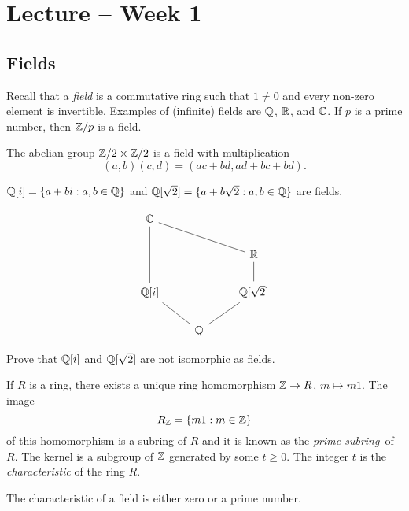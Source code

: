 \section{Lecture -- Week 1}

\subsection{Fields}

Recall that a \emph{field} is a commutative
ring such that $1\ne 0$ and 
every non-zero element is invertible. Examples
of (infinite) fields are $\mathbb{Q}$, $\mathbb{R}$, and $\mathbb{C}$. If $p$
is a prime number, then $\mathbb{Z}/p$ is a field. 

\begin{example}
\label{exa:field_size4}
	The abelian group $\mathbb{Z}/2\times\mathbb{Z}/2$ is a field
	with multiplication
	\[
		(a,b)(c,d)=(ac+bd,ad+bc+bd).
	\]
\end{example}

\begin{example}
	$\mathbb{Q}[i]=\{a+bi:a,b\in\mathbb{Q}\}$ and 
	$\mathbb{Q}[\sqrt{2}]=\{a+b\sqrt{2}:a,b\in\mathbb{Q}\}$ are fields.
\end{example}

\[
\begin{tikzcd}
	{\mathbb{C}} \\
	&& {\mathbb{R}} \\
	{\mathbb{Q}[i]} && {\mathbb{Q}[\sqrt{2}]} \\
	& {\mathbb{Q}}
	\arrow[no head, from=3-3, to=4-2]
	\arrow[no head, from=2-3, to=3-3]
	\arrow[no head, from=1-1, to=3-1]
	\arrow[no head, from=3-1, to=4-2]
	\arrow[no head, from=1-1, to=2-3]
\end{tikzcd}
\]


\begin{exercise}
\label{xca:Q(i)}
Prove that $\mathbb{Q}[i]$ and $\mathbb{Q}[\sqrt{2}]$ are not isomorphic as fields.
\end{exercise}

If $R$ is a ring, there exists a unique ring homomorphism
$\mathbb{Z}\to R$, $m\mapsto m1$. The image 
\[
R_{\mathbb{Z}}=\{m1:m\in\mathbb{Z}\}
\]
of this homomorphism is a subring 
of $R$ and it is known as the \emph{prime subring} of $R$. The
kernel is a subgroup of $\mathbb{Z}$ generated by
some $t\geq0$. The integer $t$ is 
the \emph{characteristic} of the ring $R$. 

\begin{exercise}
\label{xca: field characteristic}
The characteristic of a field is either zero or
a prime number. 
\end{exercise}

